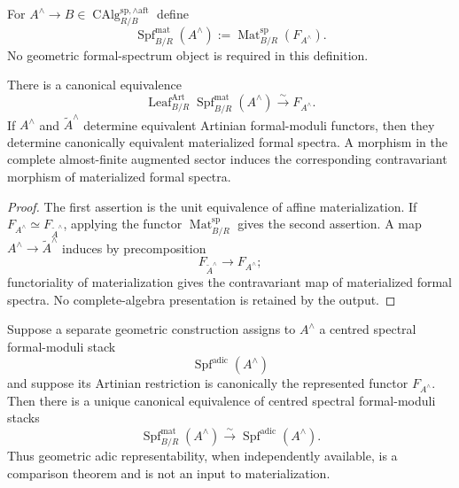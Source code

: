 \begin{definition}
\label{def:bnli-materialized-formal-spectrum}
For
$A^\wedge\to B\in
\operatorname{CAlg}^{\mathrm{sp},\wedge\mathrm{aft}}_{R/B}$ define
\[
\boxed{
    \operatorname{Spf}^{\mathrm{mat}}_{B/R}(A^\wedge)
    :=
    \operatorname{Mat}^{\mathrm{sp}}_{B/R}(F_{A^\wedge}).}
\]
No geometric formal-spectrum object is required in this definition.
\end{definition}

\begin{proposition}
\label{prop:bnli-materialized-spf-recognition}
There is a canonical equivalence
\[
\boxed{
    \operatorname{Leaf}^{\mathrm{Art}}_{B/R}
    \operatorname{Spf}^{\mathrm{mat}}_{B/R}(A^\wedge)
    \xrightarrow{\sim}
    F_{A^\wedge}.}
\]
If $A^\wedge$ and $\widetilde A^\wedge$ determine equivalent Artinian
formal-moduli functors, then they determine canonically equivalent
materialized formal spectra.  A morphism in the complete almost-finite
augmented sector induces the corresponding contravariant morphism of
materialized formal spectra.
\end{proposition}

\begin{proof}
The first assertion is the unit equivalence of affine materialization.  If
$F_{A^\wedge}\simeq F_{\widetilde A^\wedge}$, applying the functor
$\operatorname{Mat}^{\mathrm{sp}}_{B/R}$ gives the second assertion.  A map
$A^\wedge\to\widetilde A^\wedge$ induces by precomposition
\[
    F_{\widetilde A^\wedge}\longrightarrow F_{A^\wedge};
\]
functoriality of materialization gives the contravariant map of materialized
formal spectra.  No complete-algebra presentation is retained by the output.
\end{proof}

\begin{theorem}
\label{thm:bnli-represented-materialization}
Suppose a separate geometric construction assigns to $A^\wedge$ a centred
spectral formal-moduli stack
\[
    \operatorname{Spf}^{\mathrm{adic}}(A^\wedge)
\]
and suppose its Artinian restriction is canonically the represented functor
$F_{A^\wedge}$.  Then there is a unique canonical equivalence of centred
spectral formal-moduli stacks
\[
\boxed{
    \operatorname{Spf}^{\mathrm{mat}}_{B/R}(A^\wedge)
    \xrightarrow{\sim}
    \operatorname{Spf}^{\mathrm{adic}}(A^\wedge).}
\]
Thus geometric adic representability, when independently available, is a
comparison theorem and is not an input to materialization.
\end{theorem}

